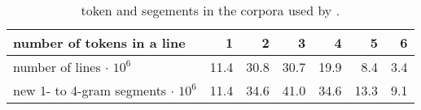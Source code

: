 \begin{table}[t]
 \caption{token and segements in the corpora used by \citet{Risvik:2003}.}
 \label{table-token-segments-risvik-2003}
 \centering
 \small
 \begin{tabular}{@{}lrrrrrr@{}}
  \toprule
 number of tokens in a line & 1 & 2 & 3 & 4 & 5 & 6 \\
  \midrule
  number of lines $\cdot$ $10^6$      					& 11.4 & 30.8 & 30.7 & 19.9 & 8.4 & 3.4  \\
  new 1- to 4-gram segments $\cdot$ $10^6$   & 11.4 & 34.6 & 41.0 & 34.6 & 13.3 & 9.1 \\
  \bottomrule
 \end{tabular}
\end{table}
